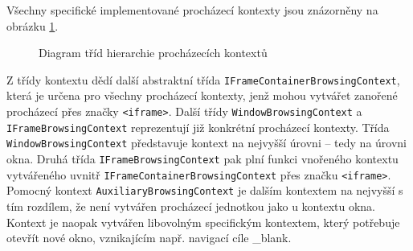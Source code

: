 Všechny specifické implementované procházecí kontexty jsou znázorněny na obrázku \ref{Figure.BrowsingContextsHierarchy}.

\begin{figure}[H]
  \begin{center}
    \caption{Diagram tříd hierarchie procházecích kontextů}
    \label{Figure.BrowsingContextsHierarchy}
  \end{center}
\end{figure}

Z třídy kontextu dědí další abstraktní třída \texttt{IFrameContainerBrowsingContext}, která je určena pro všechny procházecí kontexty, jenž mohou vytvářet zanořené procházecí přes značky \texttt{<iframe>}. Další třídy \texttt{WindowBrowsingContext} a \texttt{IFrameBrowsingContext} reprezentují již konkrétní procházecí kontexty. Třída \texttt{WindowBrowsingContext} představuje kontext na nejvyšší úrovni -- tedy na úrovni okna. Druhá třída \texttt{IFrameBrowsingContext} pak plní funkci vnořeného kontextu vytvářeného uvnitř \texttt{IFrameContainerBrowsingContext} přes značku \texttt{<iframe>}. Pomocný kontext \texttt{AuxiliaryBrowsingContext} je dalším kontextem na nejvyšší s tím rozdílem, že není vytvářen procházecí jednotkou jako u kontextu okna. Kontext je naopak vytvářen libovolným specifickým kontextem, který potřebuje otevřít nové okno, vznikajícím např. navigací cíle \_blank.

